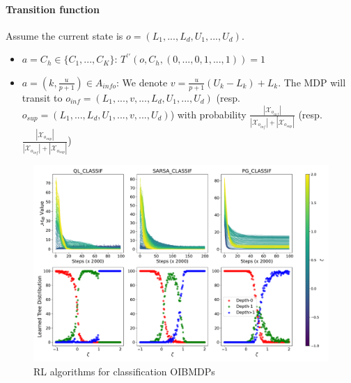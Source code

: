 \paragraph{Transition function}
Assume the current state is $o = (L_1, ..., L_d, U_1, ..., U_d)$.
\begin{itemize}
    \item $a = C_h \in \{C_1, ..., C_K\}$: $T^{\prime\prime}(o, C_h, (0,..., 0, 1, ...,1)) = 1$
    \item $a = (k, \frac{u}{p+1})\in A_{info}$: We denote $v = \frac{u}{p+1}(U_k - L_k) + L_k$. The MDP will transit to $o_{inf} = (L_1, ..., v, ..., L_d, U_1, ..., U_d)$  (resp. $o_{sup} = (L_1, ..., L_d, U_1, ..., v, ..., U_d)$) with probability $\frac{|\mathcal{X}_{o_{inf}}|}{|\mathcal{X}_{o_{inf}}| + |\mathcal{X}_{o_{sup}}|}$ (resp. $\frac{|\mathcal{X}_{o_{sup}}|}{|\mathcal{X}_{o_{inf}}| + |\mathcal{X}_{o_{sup}}|}$)
\end{itemize}

\begin{figure}
    \centering
    \includegraphics[width=1\textwidth]{images/images_part1/quick_plot_combined_classif.pdf}
    \caption{RL algorithms for classification OIBMDPs}\label{fig:rl-poibmdp}
\end{figure}
